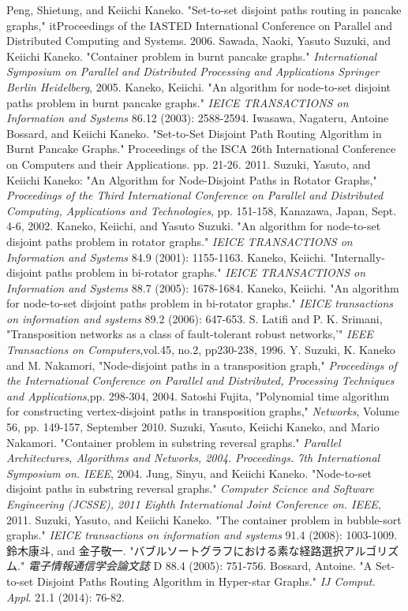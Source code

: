 \documentclass[specialreport]{subfiles}
\begin{document}
\begin{thebibliography}{9}
 Peng, Shietung, and Keiichi Kaneko. "Set-to-set disjoint paths routing in pancake graphs," it{Proceedings of the IASTED International Conference on Parallel and Distributed Computing and Systems.} 2006.
 Sawada, Naoki, Yasuto Suzuki, and Keiichi Kaneko. "Container problem in burnt pancake graphs." {\it International Symposium on Parallel and Distributed Processing and Applications Springer Berlin Heidelberg}, 2005.
 Kaneko, Keiichi. "An algorithm for node-to-set disjoint paths problem in burnt pancake graphs." {\it IEICE TRANSACTIONS on Information and Systems} 86.12 (2003): 2588-2594.
 Iwasawa, Nagateru, Antoine Bossard, and Keiichi Kaneko. "Set-to-Set Disjoint Path Routing Algorithm in Burnt Pancake Graphs." Proceedings of the ISCA 26th International Conference on Computers and their Applications. pp. 21-26. 2011.
 Suzuki, Yasuto, and Keiichi Kaneko: "An Algorithm for Node-Disjoint Paths in Rotator Graphs," {\it Proceedings of the Third International Conference on Parallel and Distributed Computing, Applications and Technologies}, pp. 151-158, Kanazawa, Japan, Sept. 4-6, 2002.
 Kaneko, Keiichi, and Yasuto Suzuki. "An algorithm for node-to-set disjoint paths problem in rotator graphs." {\it IEICE TRANSACTIONS on Information and Systems} 84.9 (2001): 1155-1163.
 Kaneko, Keiichi. "Internally-disjoint paths problem in bi-rotator graphs." {\it IEICE TRANSACTIONS on Information and Systems} 88.7 (2005): 1678-1684.
 Kaneko, Keiichi. "An algorithm for node-to-set disjoint paths problem in bi-rotator graphs." {\it IEICE transactions on information and systems} 89.2 (2006): 647-653.
S. Latifi and P. K. Srimani, "Transposition networks as a class of fault-tolerant robust networks,'" {\it IEEE Transactions on Computers},{vol.45, no.2}, pp230-238, 1996.
Y. Suzuki, K. Kaneko and M. Nakamori, "Node-disjoint paths in a transposition graph," {\it Proceedings of the International Conference on Parallel and Distributed, Processing Techniques and Applications},pp. 298-304,  2004. 
Satoshi Fujita, "Polynomial time algorithm for constructing vertex-disjoint paths in transposition graphs," {\it Networks}, Volume 56,  pp. 149-157, September 2010. 
Suzuki, Yasuto, Keiichi Kaneko, and Mario Nakamori. "Container problem in substring reversal graphs." {\it Parallel Architectures, Algorithms and Networks, 2004. Proceedings. 7th International Symposium on. IEEE}, 2004.
Jung, Sinyu, and Keiichi Kaneko. "Node-to-set disjoint paths in substring reversal graphs." {\it Computer Science and Software Engineering (JCSSE), 2011 Eighth International Joint Conference on. IEEE}, 2011.
 Suzuki, Yasuto, and Keiichi Kaneko. "The container problem in bubble-sort graphs." {\it IEICE transactions on information and systems} 91.4 (2008): 1003-1009.
 鈴木康斗, and 金子敬一. "バブルソートグラフにおける素な経路選択アルゴリズム." {\it 電子情報通信学会論文誌} D 88.4 (2005): 751-756.
Bossard, Antoine. "A Set-to-set Disjoint Paths Routing Algorithm in Hyper-star Graphs." {\it IJ Comput. Appl}. 21.1 (2014): 76-82.
\end{thebibliography}
\end{document}
